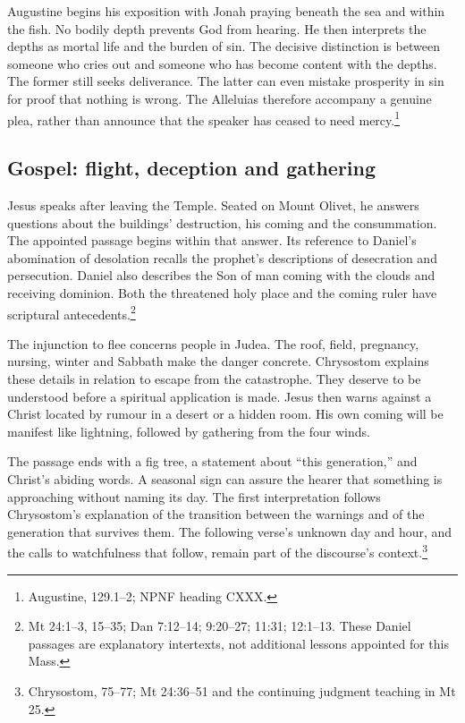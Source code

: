 Augustine begins his exposition with Jonah praying beneath the sea and
within the fish. No bodily depth prevents God from hearing. He then
interprets the depths as mortal life and the burden of sin. The decisive
distinction is between someone who cries out and someone who has become
content with the depths. The former still seeks deliverance. The latter
can even mistake prosperity in sin for proof that nothing is wrong.
The Alleluias therefore accompany a genuine plea, rather than announce
that the speaker has ceased to need mercy.\footnote{Augustine,
 129.1--2; NPNF heading CXXX.}

\subsection{Gospel: flight, deception and gathering}

Jesus speaks after leaving the Temple. Seated on Mount Olivet, he
answers questions about the buildings' destruction, his coming and the
consummation. The appointed passage begins within that answer.
Its reference to Daniel's abomination of desolation recalls the
prophet's descriptions of desecration and persecution. Daniel also
describes the Son of man coming with the clouds and receiving dominion.
Both the threatened holy place and the coming ruler have scriptural
antecedents.\footnote{Mt 24:1--3, 15--35; Dan 7:12--14; 9:20--27;
11:31; 12:1--13. These Daniel passages are explanatory intertexts,
not additional lessons appointed for this Mass.}

The injunction to flee concerns people in Judea. The roof, field,
pregnancy, nursing, winter and Sabbath make the danger concrete.
Chrysostom explains these details in relation to escape from the
catastrophe. They deserve to be understood before a spiritual
application is made. Jesus then warns against a Christ located by
rumour in a desert or a hidden room. His own coming will be manifest
like lightning, followed by gathering from the four winds.

The passage ends with a fig tree, a statement about ``this generation,''
and Christ's abiding words. A seasonal sign can assure the hearer
that something is approaching without naming its day. The first
interpretation follows Chrysostom's explanation of the transition
between the warnings and of the generation that survives them.
The following verse's unknown day and hour, and the calls to
watchfulness that follow, remain part of the discourse's
context.\footnote{Chrysostom,  75--77;
Mt 24:36--51 and the continuing judgment teaching in Mt 25.}

